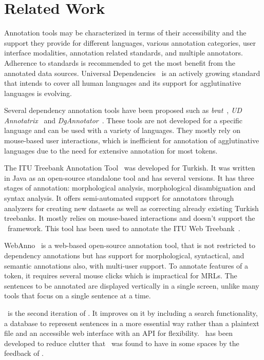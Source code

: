 \section{Related Work}
\label{sec:related}

Annotation tools may be characterized in terms of their accessibility and the support they provide for different languages, various annotation categories, user interface modalities, annotation related standards, and multiple annotators.
Adherence to standards is recommended to get the most benefit from the annotated data sources.
Universal Dependencies~\cite{UD} is an actively growing standard that intends to cover all human languages and its support for agglutinative languages is evolving.

Several dependency annotation tools have been proposed such as \textit{brat}~\cite{brat}, \textit{UD Annotatrix}~\cite{tyers-etal:2018} and \textit{DgAnnotator}~\cite{dgannotator,UD-tools}.
These tools are not developed for a specific language and can be used with a variety of languages.
They mostly rely on mouse-based user interactions, which is inefficient for annotation of agglutinative languages due to the need for extensive annotation for most tokens.

The ITU Treebank Annotation Tool~\cite{pamay-etal-2015-annotation} was developed for Turkish.
It was written in Java as an open-source standalone tool and has several versions.
It has three stages of annotation: morphological analysis, morphological disambiguation and syntax analysis.
It offers semi-automated support for annotators through analyzers for creating new datasets as well as correcting already existing Turkish treebanks.
It mostly relies on mouse-based interactions and doesn't support the \ud\ framework.
This tool has been used to annotate the ITU Web Treebank~\cite{itu-web-tb}.

WebAnno~\cite{webanno} is a web-based open-source annotation tool, that is not restricted to dependency annotations but has support for morphological, syntactical, and semantic annotations also, with multi-user support.
To annotate features of a token, it requires several mouse clicks which is impractical for MRLs.
The sentences to be annotated are displayed vertically in a single screen, unlike many tools that focus on a single sentence at a time.

\boatvtwo\ is the second iteration of \boatvone.
It improves on it by including a search functionality, a database to represent sentences in a more essential way rather than a plaintext file and an accessible web interface with an API for flexibility.
\boatvtwo\ has been developed to reduce clutter that \boatvone\ was found to have in some spaces by the feedback of \boatvone.
